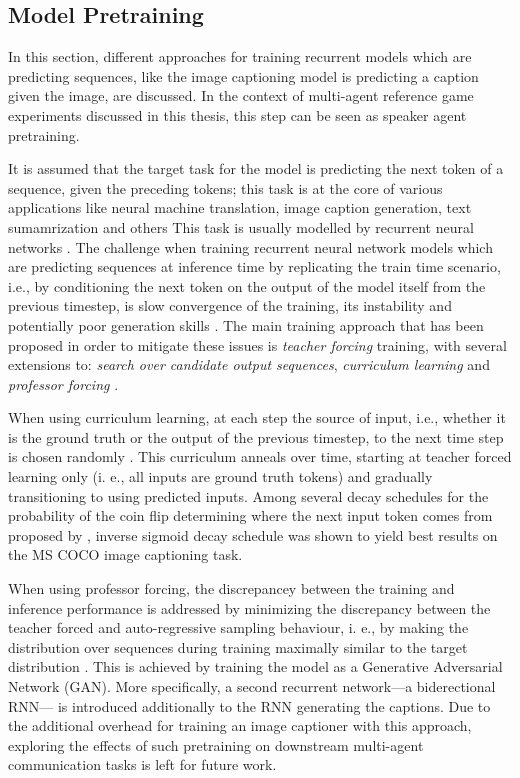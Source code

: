 \subsection{Model Pretraining}
\label{model_pretraining}
In this section, different approaches for training recurrent models which are predicting sequences, like the image captioning model is predicting a caption given the image, are discussed. In the context of multi-agent reference game experiments discussed in this thesis, this step can be seen as speaker agent pretraining.

It is assumed that the target task for the model is predicting the next token of a sequence, given the preceding tokens; this task is at the core of various applications like neural machine translation, image caption generation, text sumamrization and others \parencite[e.g.,][]{cho2014learning}  This task is usually modelled by recurrent neural networks \parencite{rumelhart1986learning}. The challenge when training recurrent neural network models which are predicting sequences at inference time by replicating the train time scenario, i.e., by conditioning the next token on the output of the model itself from the previous timestep, is slow convergence of the training, its instability and potentially poor generation skills \parencite{lamb2016professor}. The main training approach that has been proposed in order to mitigate these issues is \textit{teacher forcing} training, with several extensions to: \textit{search over candidate output sequences}, \textit{curriculum learning} and \textit{professor forcing} \parencite{goodfellow2016deep, williams1989algorithm}.

When using curriculum learning, at each step the source of input, i.e., whether it is the ground truth or the output of the previous timestep, to the next time step is chosen randomly \parencite{bengio2015scheduled}. This curriculum anneals over time, starting at teacher forced learning only (i. e., all inputs are ground truth tokens) and gradually transitioning to using predicted inputs. Among several decay schedules for the probability of the coin flip determining where the next input token comes from proposed by \cite{bengio2015scheduled}, inverse sigmoid decay schedule  was shown to yield best results on the MS COCO image captioning task.

When using professor forcing, the discrepancey between the training and inference performance is addressed by minimizing the discrepancy between the teacher forced and auto-regressive sampling behaviour, i. e., by making the distribution over sequences during training maximally similar to the target distribution \parencite{lamb2016professor}. This is achieved by training the model as a Generative Adversarial Network (GAN). More specifically, a second recurrent network---a biderectional RNN---  is introduced additionally to the RNN generating the captions. Due to the additional overhead for training an image captioner with this approach, exploring the effects of such pretraining on downstream multi-agent communication tasks is left for future work.

